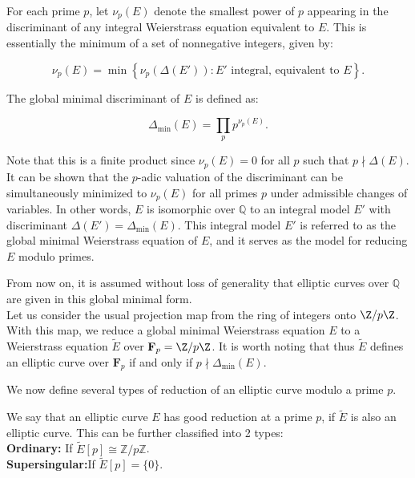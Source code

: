For each prime \(p\), let \(\nu_{p}(E)\) denote the smallest power of \(p\) appearing in the discriminant of any integral Weierstrass equation equivalent to \(E\). This is essentially the minimum of a set of nonnegative integers, given by:

\[
\nu_{p}(E) = \min \left\{\nu_{p}(\Delta(E')) : E' \text{ integral, equivalent to } E\right\}.
\]

\begin{definition}
The global minimal discriminant of \(E\) is defined as:

\[
\Delta_{\min }(E) = \prod_{p} p^{\nu_{p}(E)}.
\]
    
\end{definition}

Note that this is a finite product since \(\nu_{p}(E) = 0\) for all \(p\) such that \(p \nmid \Delta(E)\). It can be shown that the \(p\)-adic valuation of the discriminant can be simultaneously minimized to \(\nu_{p}(E)\) for all primes \(p\) under admissible changes of variables. In other words, \(E\) is isomorphic over \(\mathbb{Q}\) to an integral model \(E'\) with discriminant \(\Delta(E') = \Delta_{\min }(E)\). This integral model \(E'\) is referred to as the global minimal Weierstrass equation of \(E\), and it serves as the model for reducing \(E\) modulo primes.

From now on, it is assumed without loss of generality that elliptic curves over \(\mathbb{Q}\) are given in this global minimal form. \\

Let us consider the usual projection map from the ring of integers onto $\Z/p\Z$. With this map, we reduce a global minimal Weierstrass equation \(E\) to a Weierstrass equation \(\widetilde{E}\) over \(\mathbf{F}_{p}=\Z/p\Z\). It is worth noting that thus \(\widetilde{E}\) defines an elliptic curve over \(\mathbf{F}_{p}\) if and only if \(p \nmid \Delta_{\min }(E)\).

We now define several types of reduction of an elliptic curve modulo a prime $p$.

\begin{definition}
    We say that an elliptic curve $E$ has good reduction at a prime $p$, if \(\widetilde{E}\) is also an elliptic curve. This can be further classified into 2 types:\\
     \textbf{Ordinary:} If \(\widetilde{E}[p] \cong \mathbb{Z} / p \mathbb{Z}\). \\
     \textbf{Supersingular:}If \(\widetilde{E}[p] = \{0\}\).

\end{definition}

